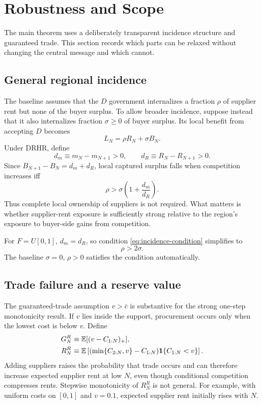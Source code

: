 \section{Robustness and Scope}
\label{sec:robustness}

The main theorem uses a deliberately transparent incidence structure and guaranteed trade. This section records which parts can be relaxed without changing the central message and which cannot.

\subsection{General regional incidence}

The baseline assumes that the $D$ government internalizes a fraction $\rho$ of supplier rent but none of the buyer surplus. To allow broader incidence, suppose instead that it also internalizes fraction $\sigma\ge0$ of buyer surplus. Its local benefit from accepting $D$ becomes
\begin{equation}
L_N=\rho R_N+\sigma B_N.
\label{eq:general-incidence}
\end{equation}
Under DRHR, define
\begin{equation}
d_m\equiv m_N-m_{N+1}>0,
\qquad
d_R\equiv R_N-R_{N+1}>0.
\end{equation}
Since $B_{N+1}-B_N=d_m+d_R$, local captured surplus falls when competition increases iff
\begin{equation}
\rho>\sigma\left(1+\frac{d_m}{d_R}\right).
\label{eq:incidence-condition}
\end{equation}
Thus complete local ownership of suppliers is not required. What matters is whether supplier-rent exposure is sufficiently strong relative to the region's exposure to buyer-side gains from competition.

For $F=U[0,1]$, $d_m=d_R$, so condition \eqref{eq:incidence-condition} simplifies to
\begin{equation}
\rho>2\sigma.
\label{eq:uniform-incidence}
\end{equation}
The baseline $\sigma=0$, $\rho>0$ satisfies the condition automatically.

\subsection{Trade failure and a reserve value}

The guaranteed-trade assumption $v>\bar c$ is substantive for the strong one-step monotonicity result. If $v$ lies inside the support, procurement occurs only when the lowest cost is below $v$. Define
\begin{align}
G_N^R&\equiv \mathbb{E}[(v-C_{1:N})_+],\label{eq:reserve-G}\\
R_N^R&\equiv \mathbb{E}\left[(\min\{C_{2:N},v\}-C_{1:N})\mathbf{1}\{C_{1:N}<v\}\right].\label{eq:reserve-R}
\end{align}
Adding suppliers raises the probability that trade occurs and can therefore increase expected supplier rent at low $N$, even though conditional competition compresses rents. Stepwise monotonicity of $R_N^R$ is not general. For example, with uniform costs on $[0,1]$ and $v=0.1$, expected supplier rent initially rises with $N$.

